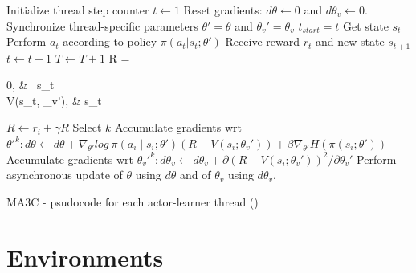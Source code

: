 \begin{algorithm}[hbtp]
\begin{algorithmic}
    \State {}
    \State {}
    \State {}
    \State Initialize thread step counter $t \leftarrow 1$
    \Repeat
        \State Reset gradients: $d\theta \leftarrow 0$ and $d\theta_v \leftarrow 0$.
        \State Synchronize thread-specific parameters $\theta' = \theta$ and $\theta_v' = \theta_v$
        \State $t_{start} = t$
        \State Get state $s_t$
        \Repeat
            \State Perform $a_t$ according to policy $\pi(a_t|s_t;\theta')$
            \State Receive reward $r_t$ and new state $s_{t+1}$
            \State $t \leftarrow t + 1$
            \State $T \leftarrow T + 1$
        \State R = \begin{cases}
                0,   & \ s_t \\
                V(s_t, \theta_v'),   &  s_t \;\\
            \end{cases}
            \State $R \leftarrow r_i + \gamma R$
            \State Select $k$ \;
            \State Accumulate gradients wrt $\theta'^k: d\theta \leftarrow d\theta + \nabla_{\theta'} log\:\pi(a_i\mid s_i;\theta')(R-V(s_i;\theta_v'))+\beta\nabla_{\theta'}H(\pi(s_i;\theta'))$
            \State Accumulate gradients wrt $\theta_v'^k: d\theta_v \leftarrow d\theta_v + \partial(R-V(s_i;\theta_v'))^2 / \partial \theta_{v}'$
        \EndFor
        \State Perform asynchronous update of $\theta$ using $d\theta$ and of $\theta_v$ using $d\theta_v$.
\end{algorithmic}
\caption{\acl{MA3C} - psudocode for each actor-learner thread (\cite{mnih2016A3C})}
\label{alg:MA3C}
\end{algorithm}

\section{Environments}

